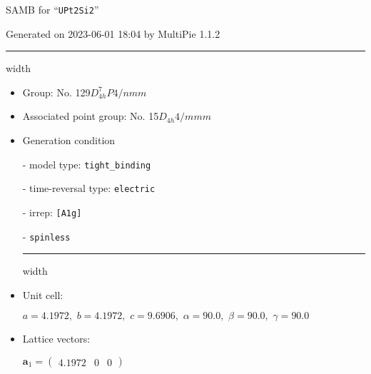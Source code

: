 \documentclass[fleqn,10pt,landscape]{article}
\begin{document}
\setcounter{MaxMatrixCols}{16}

\setlength{\baselineskip}{16pt}
\footnotesize
\begin{center}
\LARGE
SAMB for ``\texttt{UPt2Si2}''
\end{center}
\begin{flushright}
Generated on 2023-06-01 18:04 by MultiPie 1.1.2
\end{flushright}
\vspace{1cm}


 \hfil \hrule height 1mm width \textwidth \hfil

\begin{itemize}
\item Group: No. 129\quad$D_{4h}^{7}$\quad$P4/nmm$\quad[ tetragonal ]

\item Associated point group: No. 15\quad$D_{4h}$\quad$4/mmm$\quad[ tetragonal ]

\vspace{5mm}

\item Generation condition

\quad - model type: \texttt{tight_binding}

\quad - time-reversal type: \texttt{electric}

\quad - irrep: \texttt{[A1g]}

\quad - \texttt{spinless}


 \hfil \hrule height 1mm width \textwidth \hfil

\item Unit cell:

\quad $a=4.1972,\,\, b=4.1972,\,\, c=9.6906,\,\, \alpha=90.0,\,\, \beta=90.0,\,\, \gamma=90.0$

\item Lattice vectors:

\quad $\bm{a}_1=\begin{pmatrix} 4.1972 & 0 & 0 \end{pmatrix}$


\end{itemize}
\end{document}
